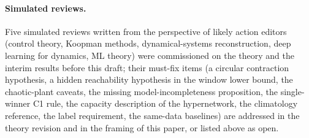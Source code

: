 \paragraph{Simulated reviews.} Five simulated reviews written from the perspective of likely action editors (control theory, Koopman methods, dynamical-systems reconstruction, deep learning for dynamics, ML theory) were commissioned on the theory and the interim results before this draft; their must-fix items (a circular contraction hypothesis, a hidden reachability hypothesis in the window lower bound, the chaotic-plant caveats, the missing model-incompleteness proposition, the single-winner C1 rule, the capacity description of the hypernetwork, the climatology reference, the label requirement, the same-data baselines) are addressed in the theory revision and in the framing of this paper, or listed above as open.
